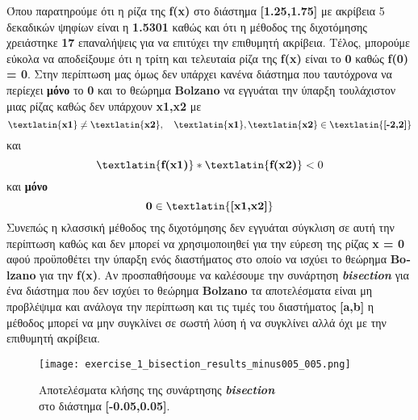 \documentclass[First Project.tex]{subfiles}
\begin{document}
Όπου παρατηρούμε ότι η ρίζα της \textlatin{\textbf{f(x)}} στο διάστημα \textlatin{\textbf{[1.25,1.75]}} με ακρίβεια 5 δεκαδικών ψηφίων 
είναι η \textbf{1.5301} καθώς και ότι η μέθοδος της διχοτόμησης χρειάστηκε \textbf{17} επαναλήψεις για να επιτύχει την επιθυμητή ακρίβεια. 
Τέλος, μπορούμε εύκολα να αποδείξουμε ότι η τρίτη και τελευταία ρίζα της \textlatin{\textbf{f(x)}} είναι το \textbf{0} καθώς 
\textlatin{\textbf{f(0) = 0}}. Στην περίπτωση μας όμως δεν υπάρχει κανένα διάστημα που ταυτόχρονα να περίεχει \textbf{μόνο} το \textbf{0} και το θεώρημα
\textlatin{\textbf{Bolzano}} να εγγυάται την ύπαρξη τουλάχιστον μιας ρίζας καθώς δεν υπάρχουν \textbf{\textlatin{x1,x2}} με 
\begin{equation*}
    \textlatin{\textbf{x1}} \neq  \textlatin{\textbf{x2}}, \quad \textlatin{\textbf{x1}},\textlatin{\textbf{x2}} \in \textlatin{\textbf{[-2,2]}} 
\end{equation*}
και
\begin{equation*}
    \textlatin{\textbf{f(x1)}} * \textlatin{\textbf{f(x2)}} < 0 
\end{equation*}
και \textbf{μόνο}
\begin{equation*}
    \textbf{0} \in  \textlatin{\textbf{[x1,x2]}} 
\end{equation*}
Συνεπώς η κλασσική μέθοδος της διχοτόμησης δεν εγγυάται σύγκλιση σε αυτή την περίπτωση καθώς και δεν μπορεί να χρησιμοποιηθεί για την εύρεση 
της ρίζας \textbf{\textlatin{x = 0}} αφού προϋποθέτει την ύπαρξη ενός διαστήματος στο οποίο να ισχύει το θεώρημα \textlatin{\textbf{Bolzano}} 
για την \textlatin{\textbf{f(x)}}. Αν προσπαθήσουμε να καλέσουμε την συνάρτηση \textit{\textlatin{\textbf{bisection}}} για ένα διάστημα που
δεν ισχύει το θεώρημα \textlatin{\textbf{Bolzano}} τα αποτελέσματα είναι μη προβλέψιμα και ανάλογα την περίπτωση και τις τιμές του 
διαστήματος \textlatin{\textbf{[a,b]}} η μέθοδος μπορεί να μην συγκλίνει σε σωστή λύση ή να συγκλίνει αλλά όχι με την επιθυμητή ακρίβεια.

\begin{figure}[h!]
    \centering
    \captionsetup{justification=centering}
    \begin{center}
        \texttt{[image: exercise\_1\_bisection\_results\_minus005\_005.png]}    
        \caption{ Αποτελέσματα κλήσης της συνάρτησης \textit{\textlatin{\textbf{bisection}}} \\ στο διάστημα \textlatin{\textbf{[-0.05,0.05]}}. }
    \end{center}
\end{figure}
\end{document}
